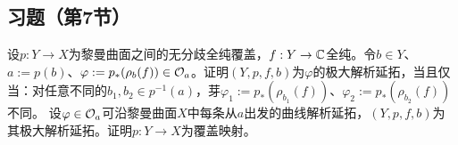 \subsection*{习题（第7节）}
设$p:Y\to X$为黎曼曲面之间的无分歧全纯覆盖，$f:Y\to\mathbb C$全纯。令$b\in Y$、$a:=p(b)$、$\varphi:=p_*(\rho_b(f))\in\mathcal O_a$。证明$(Y,p,f,b)$为$\varphi$的极大解析延拓，当且仅当：对任意不同的$b_1,b_2\in p^{-1}(a)$，芽$\varphi_1:=p_*(\rho_{b_1}(f))$、$\varphi_2:=p_*(\rho_{b_2}(f))$不同。
设$\varphi\in\mathcal O_a$可沿黎曼曲面$X$中每条从$a$出发的曲线解析延拓，$(Y,p,f,b)$为其极大解析延拓。证明$p:Y\to X$为覆盖映射。
